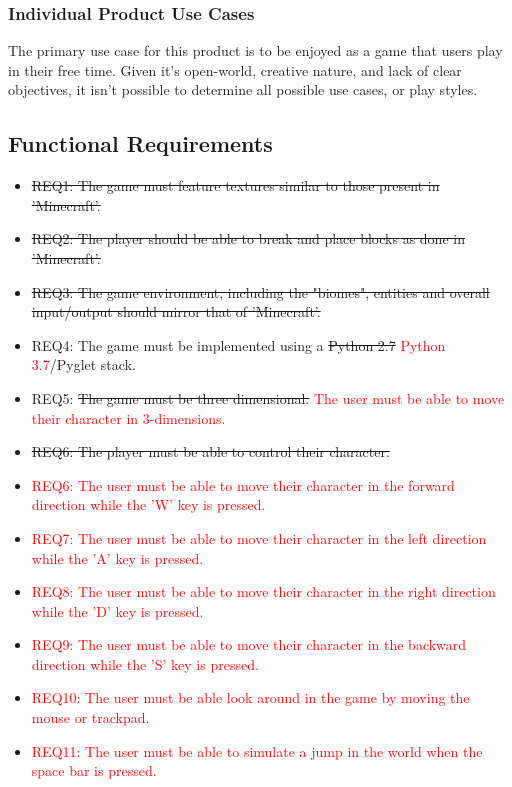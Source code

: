 \documentclass[12pt, titlepage]{article}
\begin{document}
\subsubsection{Individual Product Use Cases}

The primary use case for this product is to be enjoyed as a game that users play in their free time. Given it's open-world, creative nature, and lack of clear objectives, it isn't possible to determine all possible use cases, or play styles.

\subsection{Functional Requirements}
\begin{itemize}
    \item \sout{REQ1: The game must feature textures similar to those present in 'Minecraft'.}
    \item \sout{REQ2: The player should be able to break and place blocks as done in 'Minecraft'.}
    \item \sout{REQ3: The game environment, including the "biomes", entities and overall input/output should mirror that of 'Minecraft'.}
    \item REQ4: The game must be implemented using a \sout{Python 2.7} \textcolor{red}{Python 3.7}/Pyglet stack.
    \item REQ5: \sout{The game must be three dimensional.} \textcolor{red}{The user must be able to move their character in 3-dimensions.}
    \item \sout{REQ6: The player must be able to control their character.}
    \item \textcolor{red}{REQ6: The user must be able to move their character in the forward direction while the 'W' key is pressed.}
    \item \textcolor{red}{REQ7: The user must be able to move their character in the left direction while the 'A' key is pressed.}
    \item \textcolor{red}{REQ8: The user must be able to move their character in the right direction while the 'D' key is pressed.}
    \item \textcolor{red}{REQ9: The user must be able to move their character in the backward direction while the 'S' key is pressed.}
    \item \textcolor{red}{REQ10: The user must be able look around in the game by moving the mouse or trackpad.}
    \item \textcolor{red}{REQ11: The user must be able to simulate a jump in the world when the space bar is pressed.}

\end{itemize}
\end{document}
